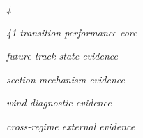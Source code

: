 \begin{center}\textit{↓}\end{center}

\begin{center}\textit{41-transition performance core}\end{center}

\begin{center}\textit{}\end{center}

\begin{center}\textit{}\end{center}

\begin{center}\textit{future track-state evidence}\end{center}

\begin{center}\textit{}\end{center}

\begin{center}\textit{}\end{center}

\begin{center}\textit{}\end{center}

\begin{center}\textit{}\end{center}

\begin{center}\textit{ section mechanism evidence}\end{center}

\begin{center}\textit{}\end{center}

\begin{center}\textit{}\end{center}

\begin{center}\textit{}\end{center}

\begin{center}\textit{wind diagnostic evidence}\end{center}

\begin{center}\textit{cross-regime external evidence}\end{center}

\begin{center}\textit{}\end{center}

